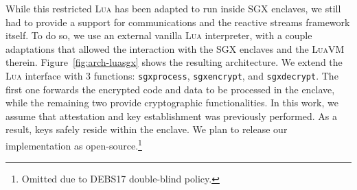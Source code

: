 While this restricted \textsc{Lua} has been adapted to run inside SGX enclaves, we still had to provide a support for communications and the reactive streams framework itself.
To do so, we use an external vanilla \textsc{Lua} interpreter, with a couple adaptations that allowed the interaction with the SGX enclaves and the \textsc{LuaVM} therein.
Figure~\ref{fig:arch-luasgx} shows the resulting architecture.
We extend the \textsc{Lua} interface with 3 functions: \texttt{sgxprocess}, \texttt{sgxencrypt}, and \texttt{sgxdecrypt}. 
The first one forwards the encrypted code and data to be processed in the enclave, while the remaining two provide cryptographic functionalities.
In this work, we assume that attestation and key establishment was previously performed.
As a result, keys safely reside within the enclave.
We plan to release our implementation as open-source.\footnote{Omitted due to DEBS17 double-blind policy.}
